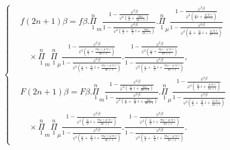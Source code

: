 \documentclass{article}
\begin{document}
\[ \left\{\begin{aligned}
&f(2n+1)\beta=f\beta.\overset{n}{\underset{1}{\Pi}}_{m}\frac{1-\frac{\varphi^{2}\beta}{\varphi^{2}\left(\frac{\omega}{2}+\frac{m\omega}{2n+1}\right)}}{1-\frac{\varphi^{2}\beta}{\varphi^{2}\left(\frac{\omega}{2}+\frac{\varpi}{2}i+\frac{m\omega}{2n+1}\right)}}.\overset{n}{\underset{1}{\Pi}}_{\mu}\frac{1-\frac{\varphi^{2}\beta}{\varphi^{2}\left(\frac{\omega}{2}i+\frac{\mu\varpi i}{2n+1}\right)}}{1-\frac{\varphi^{2}\beta}{\varphi^{2}\left(\frac{\omega}{2}+\frac{\varpi}{2}i+\frac{\mu\varpi i}{2n+1}\right)}}\\
&\quad\times\overset{n}{\underset{1}{\Pi}}_{m}\overset{n}{\underset{1}{\Pi}}_{\mu}\frac{1-\frac{\varphi^{2}\beta}{\varphi^{2}\left(\frac{\omega}{2}+\frac{m\omega+\mu\varpi i}{2n+1}\right)}}{1-\frac{\varphi^{2}\beta}{\varphi^{2}\left(\frac{\omega}{2}+\frac{\varpi}{2}i+\frac{m\omega+\mu\varpi i}{2n+1}\right)}}.\frac{1-\frac{\varphi^{2}\beta}{\varphi^{2}\left(\frac{\omega}{2}+\frac{m\omega-\mu\varpi i}{2n+1}\right)}}{1-\frac{\varphi^{2}\beta}{\varphi^{2}\left(\frac{\omega}{2}+\frac{\varpi}{2}i+\frac{m\omega-\mu\varpi i}{2n+1}\right)}},\\
&F(2n+1)\beta=F\beta.\overset{n}{\underset{1}{\Pi}}_{m}\frac{1-\frac{\varphi^{2}\beta}{\varphi^{2}\left(\frac{\varpi}{2}i+\frac{m\omega}{2n+1}\right)}}{1-\frac{\varphi^{2}\beta}{\varphi^{2}\left(\frac{\omega}{2}+\frac{\varpi}{2}i+\frac{m\omega}{2n+1}\right)}}.\overset{n}{\underset{1}{\Pi}}_{\mu}\frac{1-\frac{\varphi^{2}\beta}{\varphi^{2}\left(\frac{\varpi}{2}i+\frac{\mu\varpi i}{2n+1}\right)}}{1-\frac{\varphi^{2}\beta}{\varphi^{2}\left(\frac{\omega}{2}+\frac{\varpi}{2}i+\frac{\mu\varpi i}{2n+1}\right)}}\\
&\quad\times\overset{n}{\underset{1}{\Pi}}_{m}\overset{n}{\underset{1}{\Pi}}_{\mu}\frac{1-\frac{\varphi^{2}\beta}{\varphi^{2}\left(\frac{\varpi}{2}i+\frac{m\omega+\mu\varpi i}{2n+1}\right)}}{1-\frac{\varphi^{2}\beta}{\varphi^{2}\left(\frac{\omega}{2}+\frac{\varpi}{2}i+\frac{m\omega+\mu\varpi i}{2n+1}\right)}}.\frac{1-\frac{\varphi^{2}\beta}{\varphi^{2}\left(\frac{\varpi}{2}i+\frac{m\omega-\mu\varpi i}{2n+1}\right)}}{1-\frac{\varphi^{2}\beta}{\varphi^{2}\left(\frac{\omega}{2}+\frac{\varpi}{2}i+\frac{m\omega-\mu\varpi i}{2n+1}\right)}}.
\end{aligned}\right. \tag{130$'$.} \]
\end{document}
